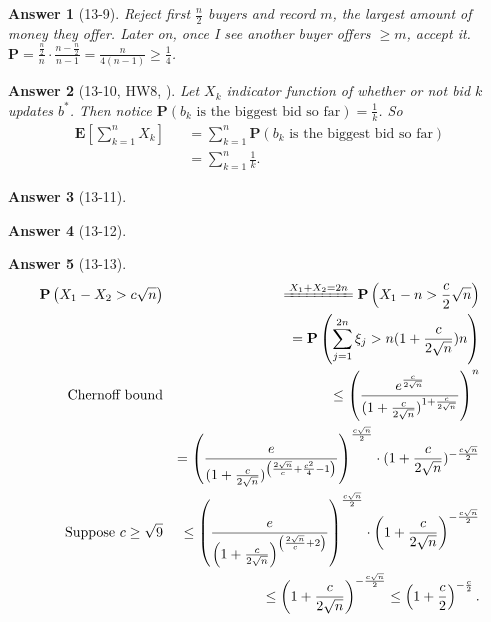 \documentclass[11pt]{article}
\theoremstyle{numberplain}
\theoremstyle{nonumberplain}
\newtheorem{ans}{Answer}
\newcommand{\0}{{\mathbf{0}}}
\newcommand{\E}{{\mathbf{E}}}
\renewcommand{\P}{{\mathbf{P}}}
\begin{document}
\begin{ans}[13-9] Reject first $\frac{n}{2}$ buyers and record $m$, the largest amount of money they offer. Later on, once I see another buyer offers $\geq m$, accept it.
$\P=\frac{\frac{n}{2}}{n}\cdot \frac{n-\frac{n}{2}}{n-1}=\frac{n}{4(n-1)}\geq \frac14$.
\end{ans}

\begin{ans}[13-10, HW8, \cite{yahoo13_10answer}] Let $X_k$ indicator function of whether or not bid $k$ updates $b^*$. Then notice 
$\P\left(b_k \text{ is the biggest bid so far}  \right)=\frac{1}{k} $. So
\begin{eqnarray*}
\E \left[\sum_{k=1}^n X_k\right] && =\sum_{k=1}^n \P\left(b_k \text{ is the biggest bid so far}  \right) \\
&&=  \sum_{k=1}^n\frac{1}{k}.
\end{eqnarray*}
\end{ans}

\begin{ans}[13-11]
\end{ans}

\begin{ans}[13-12]
\end{ans}

\begin{ans}[13-13] 
\begin{eqnarray*}
\P\left( X_1-X_2>c\sqrt{n} \right) && \xlongequal{X_1+X_2=2n} \P\left( X_1-n>\frac{c}{2}\sqrt{n} \right) \\
&& =\P\left( \sum_{j=1}^{2n}\xi_j>n(1+\frac{c}{2\sqrt{n}})n \right) \\
\text{Chernoff bound} && \leq \left( \frac{e^{\frac{c}{2\sqrt{n}}}}{(1+\frac{c}{2\sqrt{n}})^{1+\frac{c}{2\sqrt{n}}}}
\right)^{n} \\
&& =\left( \frac{e}{(1+\frac{c}{2\sqrt{n}})^{\left(\frac{2\sqrt{n}}{c}+\frac{c^2}{4}-1\right)}}\right)^{\frac{c\sqrt{n}}{2}} \cdot (1+\frac{c}{2\sqrt{n}})^{-\frac{c\sqrt{n}}{2}} \\
\text{Suppose } c\geq \sqrt{9}&& \leq \left( \frac{e}{\left(1+\frac{c}{2\sqrt{n}}\right)^{\left(\frac{2\sqrt{n}}{c}+2\right)}}\right)^{\frac{c\sqrt{n}}{2}} \cdot \left(1+\frac{c}{2\sqrt{n}}\right)^{-\frac{c\sqrt{n}}{2}} \\
&& \leq \left(1+\frac{c}{2\sqrt{n}}\right)^{-\frac{c\sqrt{n}}{2}} \leq \left(1+\frac{c}{2}\right)^{-\frac{c}{2}} .
\end{eqnarray*}
\end{ans}
\end{document}
